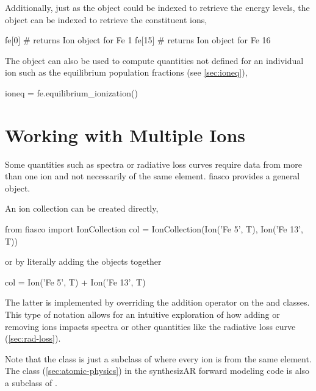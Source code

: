 Additionally, just as the  object could be indexed to retrieve the energy levels, the  object can be indexed to retrieve the constituent ions,
\begin{pyblock}[appendix1][baselinestretch=1,xleftmargin=3em]
fe[0] # returns Ion object for Fe 1
fe[15] # returns Ion object for Fe 16
\end{pyblock}

The  object can also be used to compute quantities not defined for an individual ion such as the equilibrium population fractions (see \autoref{sec:ioneq}),
\begin{pyblock}[appendix1][baselinestretch=1,xleftmargin=3em]
ioneq = fe.equilibrium_ionization()
\end{pyblock}

\section{Working with Multiple Ions}\label{sec:ion-collection}

Some quantities such as spectra or radiative loss curves require data from more than one ion and not necessarily of the same element. fiasco provides a general  object.

An ion collection can be created directly,
\begin{pyblock}[appendix1][baselinestretch=1,xleftmargin=3em]
from fiasco import IonCollection
col = IonCollection(Ion('Fe 5', T), Ion('Fe 13', T))
\end{pyblock}
or by literally adding the objects together
\begin{pyblock}[appendix1][baselinestretch=1,xleftmargin=3em]
col = Ion('Fe 5', T) + Ion('Fe 13', T)
\end{pyblock}
The latter is implemented by overriding the addition operator on the  and  classes. This type of notation allows for an intuitive exploration of how adding or removing ions impacts spectra or other quantities like the radiative loss curve (\autoref{sec:rad-loss}).

Note that the  class is just a subclass of  where every ion is from the same element. The  class (\autoref{sec:atomic-physics}) in the synthesizAR forward modeling code is also a subclass of .
